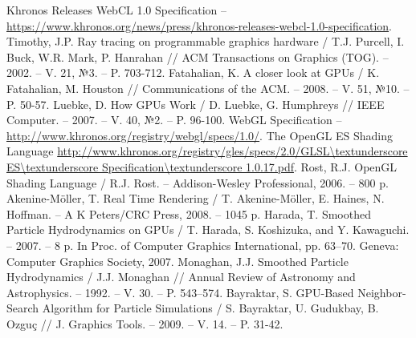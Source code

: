 \documentclass[a4paper,utf8,14pt,russian,nocolumnsxix,nocolumnxxxii,nocolumnxxxi,hpadding=10mm]{eskdtext}
\begin{document}
  \linespread{1.0} %
  \selectfont
  \maketitle
  \maketitle
  \linespread{1.35} %
  \selectfont
  
  \newpage
  \renewcommand{\contentsname}{Оглавление}
  \tableofcontents 
  
  
  
  
   
  \newpage

  \renewcommand\refname{Библиографический список}
  
  \begin{thebibliography}{}
     Khronos Releases WebCL 1.0 Specification -- \url{https://www.khronos.org/news/press/khronos-releases-webcl-1.0-specification}.
     Timothy, J.P. Ray tracing on programmable graphics hardware / T.J. Purcell, I. Buck, W.R. Mark, P. Hanrahan // ACM Transactions on Graphics (TOG). -- 2002. -- V. 21, №3. -- P. 703-712.
     Fatahalian, K. A closer look at GPUs / K. Fatahalian, M. Houston // Communications of the ACM. -- 2008. -- V. 51, №10. -- P. 50-57.
     Luebke, D. How GPUs Work / D. Luebke, G. Humphreys // IEEE Computer. -- 2007. -- V. 40, №2. -- P. 96-100.
     WebGL Specification -- \url{http://www.khronos.org/registry/webgl/specs/1.0/}.
     The OpenGL ES Shading Language \url{http://www.khronos.org/registry/gles/specs/2.0/GLSL\textunderscore ES\textunderscore Specification\textunderscore 1.0.17.pdf}.
     Rost, R.J. OpenGL Shading Language / R.J. Rost. -- Addison-Wesley Professional, 2006. -- 800 p.
     Akenine-Möller, T. Real Time Rendering / T. Akenine-Möller, E. Haines, N. Hoffman. -- A K Peters/CRC Press, 2008. -- 1045 p.
     Harada, T. Smoothed Particle Hydrodynamics on GPUs / T. Harada, S. Koshizuka, and Y. Kawaguchi. -- 2007. -- 8 p.
      In Proc. of Computer Graphics International, pp. 63–70. Geneva: Computer Graphics Society, 2007.
     Monaghan, J.J. Smoothed Particle Hydrodynamics / J.J. Monaghan // Annual Review of Astronomy and Astrophysics. -- 1992. -- V. 30. -- P. 543–574.
     Bayraktar, S. GPU-Based Neighbor-Search Algorithm for Particle Simulations / S. Bayraktar, U. Gudukbay, B. Ozguç // J. Graphics Tools. -- 2009. -- V. 14. -- P. 31-42.
  \end{thebibliography}
\end{document}
